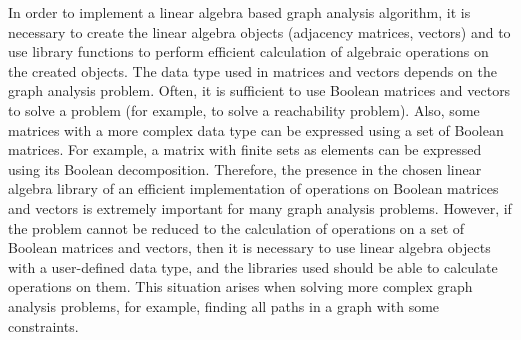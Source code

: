  In order to implement a linear algebra based graph analysis algorithm, it is necessary to create the linear algebra objects (adjacency matrices, vectors) and to use library functions to perform efficient calculation of algebraic operations on the created objects. The data type used in matrices and vectors depends on the graph analysis problem. Often, it is sufficient to use Boolean matrices and vectors to solve a problem (for example, to solve a reachability problem). Also, some matrices with a more complex data type can be expressed using a set of Boolean matrices. For example, a matrix with finite sets as elements can be expressed using its Boolean decomposition. Therefore, the presence in the chosen linear algebra library of an efficient implementation of operations on Boolean matrices and vectors is extremely important for many graph analysis problems. However, if the problem cannot be reduced to the calculation of operations on a set of Boolean matrices and vectors, then it is necessary to use linear algebra objects with a user-defined data type, and the libraries used should be able to calculate operations on them. This situation arises when solving more complex graph analysis problems, for example, finding all paths in a graph with some constraints.
 
